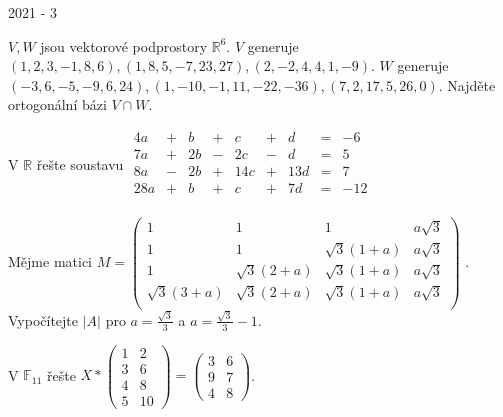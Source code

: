 
\newpage
{\large 2021 - 3}

\begin{questions}

\question \(V, W\) jsou vektorové podprostory \(\mathbb{R}^6\). \(V\) generuje \((1,2,3,-1,8,6),(1,8,5,-7,23,27),(2,-2,4,4,1,-9)\). \(W\) generuje \((-3,6,-5,-9,6,24),(1,-10,-1,11,-22,-36),(7,2,17,5,26,0)\). Najděte ortogonální bázi \(V \cap W\).

\question V \(\mathbb{R}\) řešte soustavu \(\begin{matrix}
     4a & + &  b & + &   c & + &   d & = & -6\\
     7a & + & 2b & - &  2c & - &   d & = & 5\\
     8a & - & 2b & + & 14c & + & 13d & = & 7\\
    28a & + &  b & + &   c & + &  7d & = & -12\\
\end{matrix}\)

\newpage
\question Mějme matici \(M = \begin{pmatrix}
                1 &             1 &             1 & a\sqrt{3} \\
                1 &             1 & \sqrt{3}(1+a) & a\sqrt{3} \\
                1 & \sqrt{3}(2+a) & \sqrt{3}(1+a) & a\sqrt{3} \\
    \sqrt{3}(3+a) & \sqrt{3}(2+a) & \sqrt{3}(1+a) & a\sqrt{3} \\
\end{pmatrix}\)
. Vypočítejte \(|A|\) pro \(a=\frac{\sqrt{3}}{3}\) a \(a = \frac{\sqrt{3}}{3}-1\).

\question V \(\mathbb{F}_{11}\) řešte \(X * \begin{pmatrix}
    1 & 2\\
    3 & 6\\
    4 & 8\\
    5 & 10
\end{pmatrix} = \begin{pmatrix}
    3 & 6\\
    9 & 7\\
    4 & 8
\end{pmatrix}\).


\end{questions}

